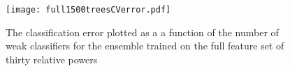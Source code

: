 \begin{figure}[h!]
  \centering
    \texttt{[image: full1500treesCVerror.pdf]}
    \caption{The classification error plotted as a a function of the number of weak classifiers for the ensemble trained on the full feature set of thirty relative powers}
    \label{fig:full1500treesCVerror}
\end{figure}



